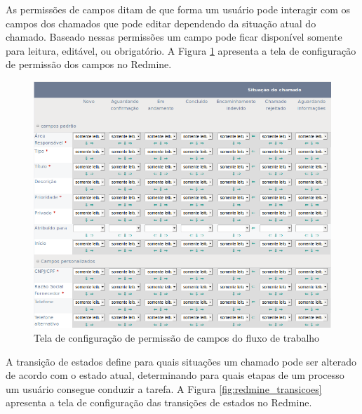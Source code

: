 As permissões de campos ditam de que forma um usuário pode interagir com os campos dos chamados que pode editar dependendo da situação atual do chamado. Baseado nessas permissões um campo pode ficar disponível somente para leitura, editável, ou obrigatório. A Figura \ref{fig:redmine_campos} apresenta a tela de configuração de permissão dos campos no Redmine.

\begin{figure}[H]
  \centering
  \includegraphics[width=1.0\textwidth]{imagens/workflow_fields.png}
  \caption{Tela de configuração de permissão de campos do fluxo de trabalho}
  \label{fig:redmine_campos}
\end{figure}

A transição de estados define para quais situações um chamado pode ser alterado de acordo com o estado atual, determinando para quais etapas de um processo um usuário consegue conduzir a tarefa. A Figura \ref{fig:redmine_transicoes} apresenta a tela de configuração das transições de estados no Redmine.

